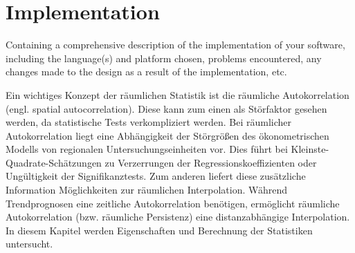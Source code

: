 \chapter{Implementation}

Containing a comprehensive description of the implementation of your software, including the language(s) and platform chosen, problems encountered, any changes made to the design as a result of the implementation, etc.

Ein wichtiges Konzept der räumlichen Statistik ist die räumliche Autokorrelation (engl. spatial autocorrelation).
Diese kann zum einen als Störfaktor gesehen werden, da statistische Tests verkompliziert werden. 
Bei räumlicher Autokorrelation liegt eine Abhängigkeit der Störgrößen des ökonometrischen Modells von regionalen 
Untersuchungseinheiten vor. Dies führt bei Kleinste-Quadrate-Schätzungen zu Verzerrungen der Regressionskoeffizienten 
oder Ungültigkeit der Signifikanztests. Zum anderen liefert diese zusätzliche Information Möglichkeiten 
zur räumlichen Interpolation. Während Trendprognosen eine zeitliche Autokorrelation benötigen, 
ermöglicht räumliche Autokorrelation (bzw. räumliche Persistenz) eine distanzabhängige Interpolation. 
In diesem Kapitel werden Eigenschaften und Berechnung der Statistiken untersucht.
